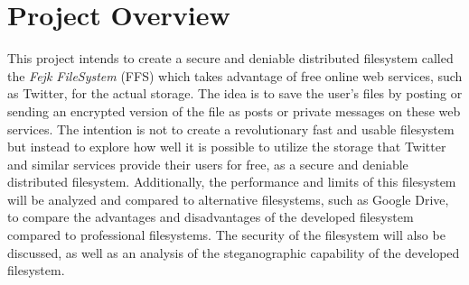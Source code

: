 \section{Project Overview}

This project intends to create a secure and deniable distributed filesystem called the \textit{Fejk FileSystem} (FFS) which takes advantage of free online web services, such as Twitter, for the actual storage. The idea is to save the user's files by posting or sending an encrypted version of the file as posts or private messages on these web services. The intention is not to create a revolutionary fast and usable filesystem but instead to explore how well it is possible to utilize the storage that Twitter and similar services provide their users for free, as a secure and deniable distributed filesystem. Additionally, the performance and limits of this filesystem will be analyzed and compared to alternative filesystems, such as Google Drive, to compare the advantages and disadvantages of the developed filesystem compared to professional filesystems. The security of the filesystem will also be discussed, as well as an analysis of the steganographic capability of the developed filesystem.